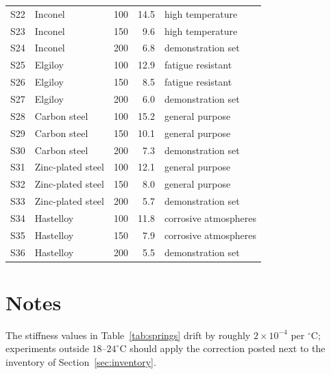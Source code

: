 \documentclass[11pt]{article}
\begin{document}
\begin{longtable}{@{}clrrl@{}}
  S22 & Inconel & 100 & 14.5 & high temperature \\
  S23 & Inconel & 150 & 9.6 & high temperature \\
  S24 & Inconel & 200 & 6.8 & demonstration set \\
  S25 & Elgiloy & 100 & 12.9 & fatigue resistant \\
  S26 & Elgiloy & 150 & 8.5 & fatigue resistant \\
  S27 & Elgiloy & 200 & 6.0 & demonstration set \\
  S28 & Carbon steel & 100 & 15.2 & general purpose \\
  S29 & Carbon steel & 150 & 10.1 & general purpose \\
  S30 & Carbon steel & 200 & 7.3 & demonstration set \\
  S31 & Zinc-plated steel & 100 & 12.1 & general purpose \\
  S32 & Zinc-plated steel & 150 & 8.0 & general purpose \\
  S33 & Zinc-plated steel & 200 & 5.7 & demonstration set \\
  S34 & Hastelloy & 100 & 11.8 & corrosive atmospheres \\
  S35 & Hastelloy & 150 & 7.9 & corrosive atmospheres \\
  S36 & Hastelloy & 200 & 5.5 & demonstration set \\
\end{longtable}

\section{Notes}
\label{sec:notes}

The stiffness values in Table~\ref{tab:springs} drift by roughly
$2 \times 10^{-4}$ per $^{\circ}$C; experiments outside $18$--$24^{\circ}$C
should apply the correction posted next to the inventory of
Section~\ref{sec:inventory}.
\end{document}
